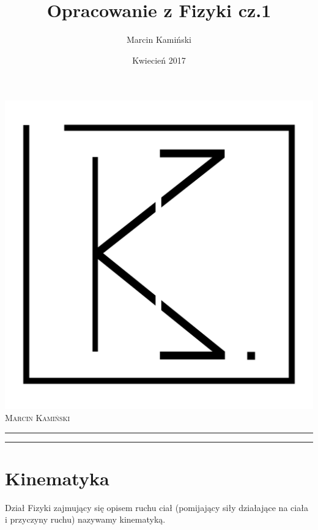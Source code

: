 \documentclass[12pt,twoside,a4paper]{book}
\title{Opracowanie z Fizyki cz.1}
\author{Marcin Kamiński}
\date{Kwiecień 2017}
\makeatletter
\let\thetitle\@title
\let\thedate\@date
\makeatother
\begin{document}
\begin{titlepage}
	\centering
	\includegraphics[scale = 0.1]{logo}\\[1.0 cm]	%
	\textsc{\Large Marcin Kamiński} %
	\rule{\linewidth}{0.4 mm}
	\huge \bfseries {\thetitle}
	\rule{\linewidth}{0.4 mm}
	\textsc{\small \thedate}
\end{titlepage}


\raggedbottom
\tableofcontents


\chapter{Kinematyka}
Dział Fizyki zajmujący się opisem ruchu ciał (pomijający siły działające na ciała i przyczyny ruchu) nazywamy kinematyką.
\end{document}

